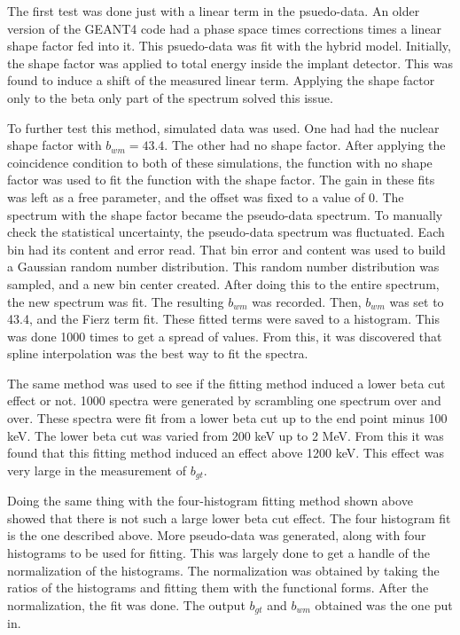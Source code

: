 \documentclass[../MaxHughesThesis.tex]{subfiles}
\begin{document}
The first test was done just with a linear term in the psuedo-data.
An older version of the GEANT4 code had a phase space times corrections times a linear shape factor fed into it.
This psuedo-data was fit with the hybrid model.
Initially, the shape factor was applied to total energy inside the implant detector.
This was found to induce a shift of the measured linear term.
Applying the shape factor only to the beta only part of the spectrum solved this issue. 

To further test this method, simulated data was used. 
One had had the nuclear shape factor with $b_{wm} = 43.4$.  
The other had no shape factor.
After applying the coincidence condition to both of these simulations, the function with no shape factor was used to fit the function with the shape factor. 
The gain in these fits was left as a free parameter, and the offset was fixed to a value of 0. 
The spectrum with the shape factor became the pseudo-data spectrum.
To manually check the statistical uncertainty, the pseudo-data spectrum was fluctuated.
Each bin had its content and error read. 
That bin error and content was used to build a Gaussian random number distribution.
This random number distribution was sampled, and a new bin center created.
After doing this to the entire spectrum, the new spectrum was fit.
The resulting $b_{wm}$ was recorded.
Then, $b_{wm}$ was set to 43.4, and the Fierz term fit. 
These fitted terms were saved to a histogram.
This was done 1000 times to get a spread of values.
From this, it was discovered that spline interpolation was the best way to fit the spectra.

The same method was used to see if the fitting method induced a lower beta cut effect or not. 
1000 spectra were generated by scrambling one spectrum over and over.
These spectra were fit from a lower beta cut up to the end point minus 100 keV.
The lower beta cut was varied from 200 keV up to 2 MeV.
From this it was found that this fitting method induced an effect above 1200 keV.
This effect was very large in the measurement of $b_{gt}$.

Doing the same thing with the four-histogram fitting method shown above showed that there is not such a large lower beta cut effect.
The four histogram fit is the one described above. 
More pseudo-data was generated, along with four histograms to be used for fitting.
This was largely done to get a handle of the normalization of the histograms.
The normalization was obtained by taking the ratios of the histograms and fitting them with the functional forms. 
After the normalization, the fit was done.
The output $b_{gt}$ and $b_{wm}$ obtained was the one put in.
\end{document}
